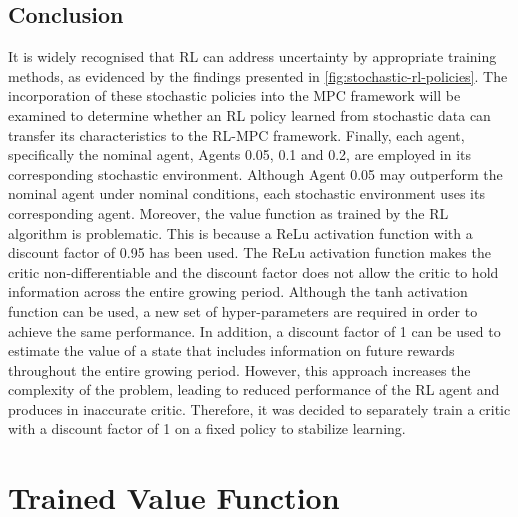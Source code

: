 \subsection{Conclusion}
It is widely recognised that RL can address uncertainty by appropriate training methods, as evidenced by the findings presented in \autoref{fig:stochastic-rl-policies}. The incorporation of these stochastic policies into the MPC framework will be examined to determine whether an RL policy learned from stochastic data can transfer its characteristics to the RL-MPC framework. Finally, each agent, specifically the nominal agent, Agents 0.05, 0.1 and 0.2, are employed in its corresponding stochastic environment. Although Agent 0.05 may outperform the nominal agent under nominal conditions, each stochastic environment uses its corresponding agent. Moreover, the value function as trained by the RL algorithm is problematic. This is because a ReLu activation function with a discount factor of 0.95 has been used. The ReLu activation function makes the critic non-differentiable and the discount factor does not allow the critic to hold information across the entire growing period. Although the tanh activation function can be used, a new set of hyper-parameters are required in order to achieve the same performance. In addition, a discount factor of 1 can be used to estimate the value of a state that includes information on future rewards throughout the entire growing period. However, this approach increases the complexity of the problem, leading to reduced performance of the RL agent and produces in inaccurate critic. Therefore, it was decided to separately train a critic with a discount factor of 1 on a fixed policy to stabilize learning.

\section{Trained Value Function}
\label{section:trained-vf}

